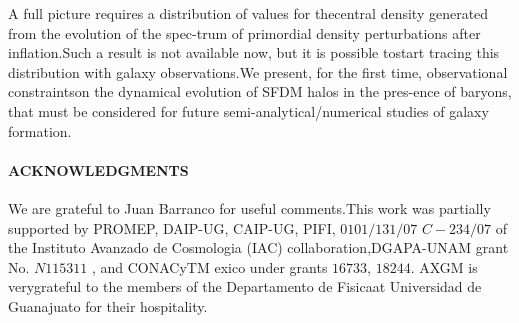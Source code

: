 \documentclass{article}\newcommand\Star[1]{#1\textsuperscript{*}}
\begin{document}
\begin{multicols}{2}
	A full picture requires a distribution of values for thecentral density generated from the evolution of the spec-trum of primordial density perturbations after inflation.Such a result is not available now,  but it is possible tostart tracing this distribution with galaxy observations.We present, for the first time, observational constraintson the dynamical evolution of SFDM halos in the pres-ence of baryons, that must be considered for future semi-analytical/numerical studies of galaxy formation.
	\paragraph{ACKNOWLEDGMENTS}
	 We are grateful to Juan Barranco for useful comments.This work was partially supported by PROMEP, DAIP-UG, CAIP-UG, PIFI, \(0101/131/07 \) \(C-234/07\) of the Instituto  Avanzado  de  Cosmologia  (IAC)  collaboration,DGAPA-UNAM  grant  No. \(N115311\) ,  and  CONACyTM exico  under  grants \(16733\), \(18244\).  AXGM  is  verygrateful to the members of the Departamento de Fisicaat Universidad de Guanajuato for their hospitality.
	 
	 
	 
	 
\end{multicols}  
 
\end{document}
